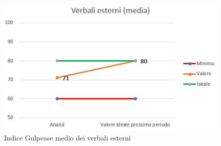 \begin{figure}
	\centering
	\includegraphics[scale=1]{Images/VerbaliEsterni.JPG}
	\caption{Indice Gulpease medio dei verbali esterni}
\end{figure}